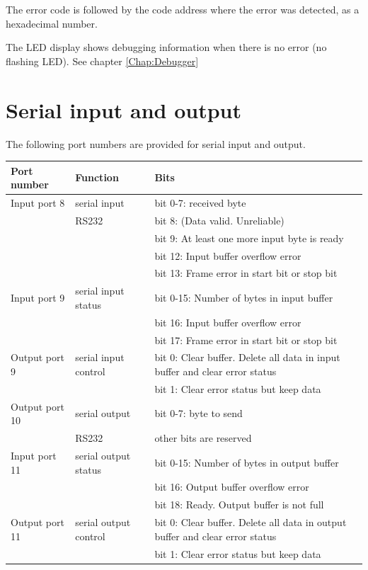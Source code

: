 \documentclass[11pt,a4paper,oneside,openright]{report}
\newcommand{\vv}{ \vspace{2mm} }   %
\begin{document}
The error code is followed by the code address where the error was detected, as a hexadecimal number.
\vv

The LED display shows debugging information when there is no error (no flashing LED). See chapter \ref{Chap:Debugger}
\vv

\chapter{Serial input and output} \label{Chap:SerialIO}

The following port numbers are provided for serial input and output.
\vv

\begin{tabular}{|l|l|l|} 
\hline
\bfseries Port number & \bfseries Function & \bfseries Bits \\ \hline
Input port 8 & serial input & bit 0-7: received byte \\
             & RS232        & bit 8: (Data valid. Unreliable) \\
             &              & bit 9: At least one more input byte is ready \\
             &              & bit 12: Input buffer overflow error \\
             &              & bit 13: Frame error in start bit or stop bit \\ \hline
Input port 9 & serial input status & bit 0-15: Number of bytes in input buffer \\
             &              & bit 16: Input buffer overflow error \\
             &              & bit 17: Frame error in start bit or stop bit\\ \hline
Output port 9 & serial input control & bit 0: Clear buffer. Delete all data in input buffer and clear error status \\
             &              & bit 1: Clear error status but keep data \\ \hline
Output port 10 & serial output & bit 0-7: byte to send \\
              & RS232         & other bits are reserved  \\ \hline
Input port 11 & serial output status & bit 0-15: Number of bytes in output buffer \\
              &              & bit 16: Output buffer overflow error \\
              &              & bit 18: Ready. Output buffer is not full \\ \hline
Output port 11 & serial output control & bit 0: Clear buffer. Delete all data in output buffer and clear error status \\
             &              & bit 1: Clear error status but keep data \\ \hline
\end{tabular}
\vv
\end{document}
